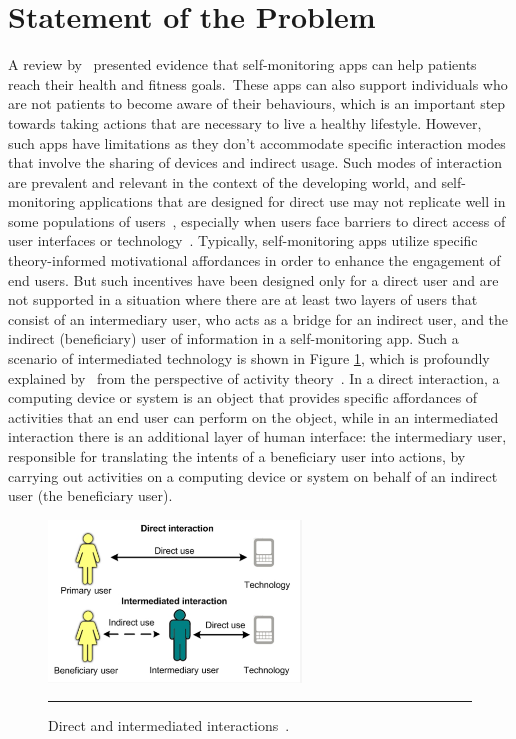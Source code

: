 \section{Statement of the Problem}
A review by~\cite{higgins2016smartphone} presented evidence that self-monitoring apps can help patients reach their health and fitness goals.~These apps can also support individuals who are not patients to become aware of their behaviours, which is an important step towards taking actions that are necessary to live a healthy lifestyle. However, such apps have limitations as they don't accommodate specific interaction modes that involve the sharing of devices and indirect usage. Such modes of interaction are prevalent and relevant in the context of the developing world, and self-monitoring applications that are designed for direct use may not replicate well in some populations of users~\citep{kaplan2006can,sambasivan2010}, especially when users face barriers to direct access of user interfaces or technology~\citep{kumar2015mobile}. Typically, self-monitoring apps utilize  specific theory-informed motivational affordances in order to enhance the engagement of end users. But such incentives have been designed only for a direct user and are not supported in a situation where there are at least two layers of users that consist of an intermediary user, who acts as a bridge for an indirect user, and the indirect (beneficiary) user of information in a self-monitoring app. Such a scenario of intermediated technology is shown in Figure \ref{figure:directVSinterm}, which is profoundly explained by~\cite{sambasivan2010} from the perspective of activity theory~\citep{kaptelinin1997activity}. In a direct interaction, a computing device or system is an object that provides specific affordances of activities that an end user can perform on the object, while in an intermediated interaction there is an additional layer of human interface: the intermediary user, responsible for translating the intents of a beneficiary user into actions, by carrying out activities on a computing device or system on behalf of an indirect user (the beneficiary user).
\begin{figure}[htbp]
  \centering
    \includegraphics[width=0.6\textwidth]{Figures/intermediated.png}
    \rule{35em}{0.5pt}
  \caption{Direct and intermediated interactions~\citep{sambasivan2010}.}
  \label{figure:directVSinterm}
\end{figure}

